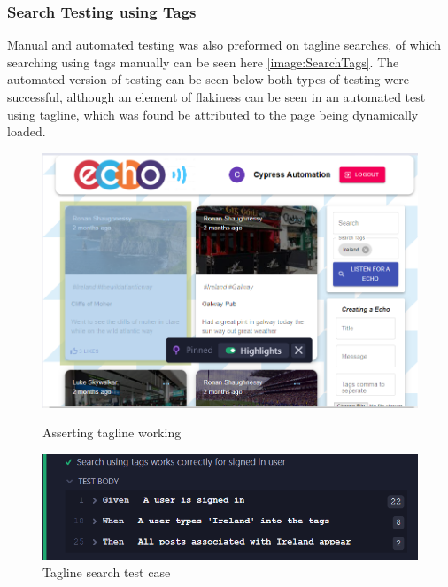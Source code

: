 \subsubsection{Search Testing using Tags}
Manual and automated testing was also preformed on tagline searches, of which searching using tags manually can be seen here \ref{image:SearchTags}. The automated version of testing can be seen below both types of testing were successful, although an element of flakiness can be seen in an automated test using tagline, which was found be attributed to the page being dynamically loaded.
\begin{figure}[ht]
    \hspace{0.5cm}
    \begin{minipage}[b]{0.3\linewidth}
    \centering
   \includegraphics[width=\linewidth]{images/TagS}
    \caption{Asserting tagline working}
    \label{image:TagS}
\end{minipage}
    \hspace{0.5cm}
    \begin{minipage}[b]{0.5\linewidth}
    \centering
   \includegraphics[width=\linewidth]{images/TagG}
    \caption{Tagline search test case}
    \label{image:TagG}
\end{minipage}
\end{figure}

